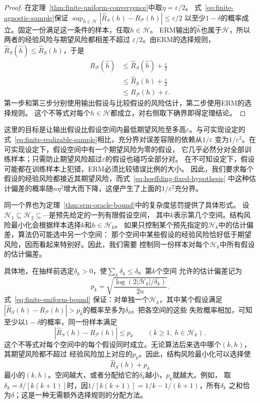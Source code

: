 \begin{proof}
在定理~\ref{thm:finite-uniform-convergence}中取$\eta=\varepsilon/2$。
式~\eqref{eq:finite-agnostic-sample}保证
$\sup_{h\in\mathcal H}|\hat R_S(h)-R_{\mathcal P}(h)|\leq\varepsilon/2$
以至少$1-\delta$的概率成立。固定一份满足这一条件的样本，任取$h\in\mathcal H$。
ERM输出的$\hat h$也属于$\mathcal H$，所以两者的经验风险与期望风险都相差不超过
$\varepsilon/2$。由ERM的选择规则，$\hat R_S(\hat h)\leq\hat R_S(h)$，于是
\begin{align*}
 R_{\mathcal P}(\hat h)
 &\leq\hat R_S(\hat h)+\frac{\varepsilon}{2}\\
 &\leq\hat R_S(h)+\frac{\varepsilon}{2}\\
 &\leq R_{\mathcal P}(h)+\varepsilon.
\end{align*}
第一步和第三步分别使用输出假设与比较假设的风险估计，第二步使用ERM的选择规则。
这个不等式对每个$h\in\mathcal H$都成立，对右侧取下确界即得定理结论。
\end{proof}

这里的目标是让输出假设比假设空间内最低期望风险至多高$\varepsilon$。与可实现设定的
式~\eqref{eq:finite-realizable-sample}相比，充分界对误差容限的依赖从$1/\varepsilon$
变为$1/\varepsilon^2$。在可实现设定下，假设空间中有一个期望风险为零的假设，
它几乎必然分对全部训练样本；只需防止期望风险超过$\varepsilon$的假设也碰巧全部分对。
在不可知设定下，假设可能都在训练样本上犯错，ERM必须比较错误比例的大小。
因此，我们要求每个假设的经验风险都接近其期望风险，而式~\eqref{eq:hoeffding-fixed-hypothesis}
中这种估计偏差的概率随$n\eta^2$增大而下降，这便产生了上面的$1/\varepsilon^2$充分界。

同一个界也为定理~\ref{thm:srm-oracle-bound}中的复杂度惩罚提供了具体形式。
设$\mathcal H_1\subseteq\mathcal H_2\subseteq\cdots$是预先给定的一列有限假设空间，
其中$k$表示第几个空间。结构风险最小化会根据样本选择$k$和$h\in\mathcal H_k$。
如果只控制某个预先指定的$\mathcal H_k$中的估计偏差，算法仍可能选中另一个空间：
那个空间中某些假设的经验风险恰好低于期望风险，因而看起来特别好。因此，我们需要
控制同一份样本对每个$\mathcal H_k$中所有假设的估计偏差。

具体地，在抽样前选定$\delta_k>0$，使$\sum_k\delta_k\leq\delta$。第$k$个空间
允许的估计偏差记为
\[
 p_k=\sqrt{\frac{\log(2|\mathcal H_k|/\delta_k)}{2n}}.
\]
式~\eqref{eq:finite-uniform-bound}
保证：对单独一个$\mathcal H_k$，其中某个假设满足
$|\hat R_S(h)-R_{\mathcal P}(h)|>p_k$的概率至多为$\delta_k$。把各空间的这些
失败概率相加，可知至少以$1-\delta$的概率，同一份样本满足
\[
 |\hat R_S(h)-R_{\mathcal P}(h)|\leq p_k
 \qquad(k\geq1,\ h\in\mathcal H_k).
\]
这个不等式对每个空间中的每个假设同时成立。无论算法后来选中哪个$(k,h)$，其期望风险都不超过
经验风险加上对应的$p_k$。因此，结构风险最小化可以选择使
\begin{equation}
 \hat R_S(h)+p_k
 \label{eq:srm-finite-penalty}
\end{equation}
最小的$(k,h)$。空间越大，或者分配给它的$\delta_k$越小，$p_k$就越大。例如，
取$\delta_k=\delta/[k(k+1)]$时，因$1/[k(k+1)]=1/k-1/(k+1)$，所有$\delta_k$
之和恰为$\delta$；这是一种无需额外选择规则的分配方法。

